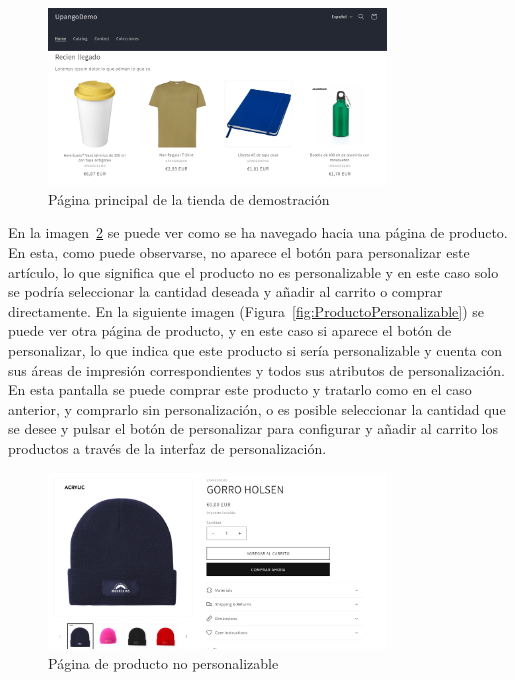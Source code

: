 \documentclass[11pt]{article}
\begin{document}
\begin{figure}[H]
    \centering
    \includegraphics[width=0.8\textwidth]{imagenes/ManualUsuario/HomeTiendaDemo.png}
    \caption{\label{fig:HomeTiendaDemo}Página principal de la tienda de demostración}
    \vspace{\fill}
\end{figure}

En la imagen~\ref{fig:ProductoNoPersonalizable} se puede ver como se ha navegado hacia una página de producto. En esta, como puede observarse, no aparece el botón para personalizar este
artículo, lo que significa que el producto no es personalizable y en este caso solo se podría seleccionar la cantidad deseada y añadir al carrito o comprar directamente.
En la siguiente imagen (Figura~\ref{fig:ProductoPersonalizable}) se puede ver otra página de producto, y en este caso si aparece el botón de personalizar, lo que indica que este producto
si sería personalizable y cuenta con sus áreas de impresión correspondientes y todos sus atributos de personalización. En esta pantalla se puede comprar este producto y tratarlo como en el caso anterior,
y comprarlo sin personalización, o es posible seleccionar la cantidad que se desee y pulsar el botón de personalizar para configurar y añadir al carrito los productos a través de la interfaz de personalización.

\begin{figure}[H]
    \centering
    \includegraphics[width=0.8\textwidth]{imagenes/ManualUsuario/PaginaProductoSinPersonalizacion.png}
    \caption{\label{fig:ProductoNoPersonalizable}Página de producto no personalizable}
    \vspace{\fill}
\end{figure}
\end{document}
